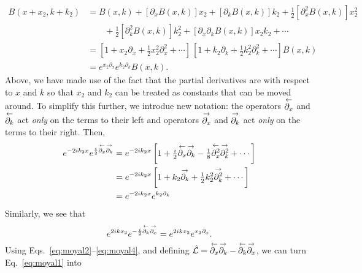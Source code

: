 \begin{equation}
  \begin{aligned}
    B(x + x_{2}, k + k_{2}) &= B(x, k) + [\partial_{x} B(x, k)]x_{2} + [\partial_{k} B(x, k)] k_{2} + \tfrac{1}{2} [\partial^{2}_{x} B(x, k)] x_{2}^{2}\\
    &\qquad + \tfrac{1}{2} [\partial^{2}_{k} B(x, k)] k_{2}^{2} + [\partial_{x}\partial_{k} B(x, k)] x_{2}k_{2} + \cdots \\
    &= \left[1 + x_{2}\partial_{x} + \tfrac{1}{2}x_{2}^{2}\partial^{2}_{x} + \cdots \right]\,
  \left[1 + k_{2}\partial_{k} + \tfrac{1}{2}k_{2}^{2}\partial^{2}_{k} + \cdots \right] B(x, k)\\
    &= e^{x_{2}\partial_{x}} e^{k_{2}\partial_{k}} B(x, k).\label{eq:moyal2}
  \end{aligned}
\end{equation}
%
Above, we have made use of the fact that the partial derivatives are with respect to $x$ and $k$ so that $x_{2}$ and $k_{2}$ can be treated as constants that can be moved around.
To simplify this further, we introdue new notation: the operators $\overset{\gets}{\partial_{x}}$ and $\overset{\gets}{\partial_{k}}$ act \emph{only} on the terms to their left and operators $\overset{\to}{\partial_{x}}$ and $\overset{\to}{\partial_{k}}$ act \emph{only} on the terms to their right.
Then,
%
\begin{equation}
  \begin{aligned}
    e^{-2ik_{2}x} e^{\frac{i}{2}\overset{\gets}{\partial_{x}}\overset{\to}{\partial_{k}}} &= e^{-2ik_{2}x} \left[1 +  \tfrac{i}{2}\overset{\gets}{\partial_{x}}\overset{\to}{\partial_{k}} - \tfrac{1}{8}\overset{\gets}{\partial^{2}_{x}}\overset{\to}{\partial^{2}_{k}} + \cdots \right]\\
                                                            &= e^{-2ik_{2}x} \left[1 +  k_{2}\overset{\to}{\partial_{k}} + \tfrac{1}{2}k_{2}^{2}\overset{\to}{\partial^{2}_{k}} + \cdots \right]\\
                                                            &= e^{-2ik_{2}x}e^{k_{2}\partial_{k}}
  \end{aligned}\label{eq:moyal3}
\end{equation}
%
Similarly, we see that
%
\begin{equation}
  e^{2ikx_{2}}e^{-\frac{i}{2}\overset{\gets}{\partial_{k}}\overset{\to}{\partial_{x}}} = e^{2ikx_{2}}e^{x_{2}\partial_{x}}.\label{eq:moyal4}
\end{equation}
%
Using Eqs.~\eqref{eq:moyal2}--\eqref{eq:moyal4}, and defining $\hat{\mathcal{L}} = \overset{\gets}{\partial_{x}} \overset{\to}{\partial_{k}} - \overset{\gets}{\partial_{k}}\overset{\to}{\partial_{x}}$, we can turn Eq.~\eqref{eq:moyal1} into

